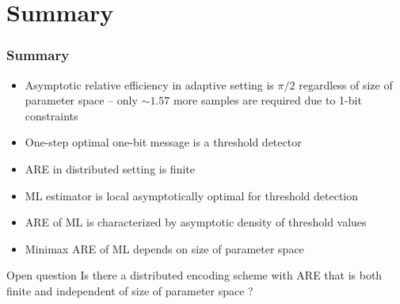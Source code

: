 \documentclass[mathserif]{beamer}
\begin{document}
\section{Summary}

\begin{frame}
\frametitle{Summary}
\begin{itemize}
\item Asymptotic relative efficiency in adaptive setting is $\pi/2$ regardless of size of parameter space -- only $\sim 1.57$ more samples are required due to 1-bit constraints
\item One-step optimal one-bit message is a threshold detector
\item ARE in distributed setting is finite
\item 
ML estimator is local asymptotically optimal for threshold detection
\item ARE of ML is characterized by asymptotic density of threshold values
\item Minimax ARE of ML depends on size of parameter space
\end{itemize}

\bigskip
\begin{alertblock}{Open question}
Is there a distributed encoding scheme with ARE that is both finite and independent of size of parameter space ?
\end{alertblock}


\end{frame}
\end{document}

